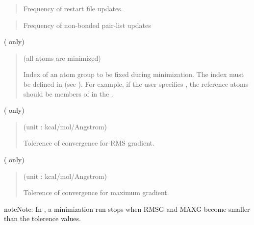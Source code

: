 \documentclass[a4paper,11pt,oneside,english]{sphinxmanual}
\begin{document}
 
\begin{quote}


Frequency of restart file updates.
\end{quote}

 
\begin{quote}


Frequency of non-bonded pair-list updates
\end{quote}

  ( only)
\begin{quote}

 (all atoms are minimized)

Index of an atom group to be fixed during minimization.
The index must be defined in \sphinxstylestrong{{[}SELECTION{]}} (see {\hyperref[\detokenize{11_Selection:selection}]{}}).
For example, if the user specifies , the reference atoms
should be members of  in the \sphinxstylestrong{{[}SELECTION{]}}.
\end{quote}

  ( only)
\begin{quote}

 (unit : kcal/mol/Angstrom)

Tolerence of convergence for RMS gradient.
\end{quote}

  ( only)
\begin{quote}

 (unit : kcal/mol/Angstrom)

Tolerence of convergence for maximum gradient.
\end{quote}

\begin{sphinxadmonition}{note}{Note:}
In , a minimization run stops when  RMSG and MAXG
become smaller than the tolerence values.
\end{sphinxadmonition}
\end{document}
